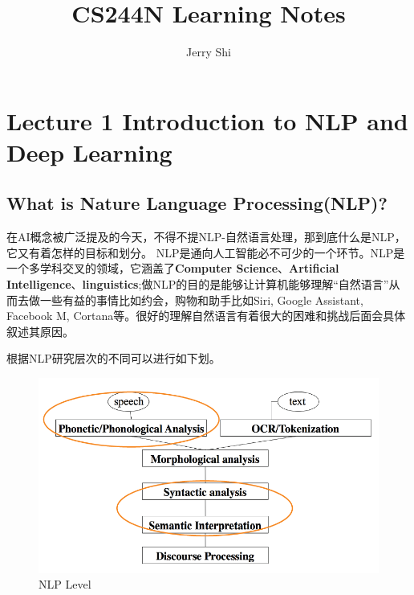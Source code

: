 \documentclass[twoside,nofonts,fancyhdr,openany,UTF8]{ctexbook}
\title{CS244N Learning Notes}	%
\author{Jerry Shi}			%
\affil{HELIX LAB}
\begin{document}
\maketitle					%

\tableofcontents 			%

\mainmatter 				%
\renewcommand\thesection{\arabic {section}}

\section{Lecture 1 Introduction to NLP and Deep Learning}			%
\subsection{What is Nature Language Processing(NLP)?}
在AI概念被广泛提及的今天，不得不提NLP-自然语言处理，那到底什么是NLP，它又有着怎样的目标和划分。
NLP是通向人工智能必不可少的一个环节。NLP是一个多学科交叉的领域，它涵盖了\textbf{Computer Science}、\textbf{Artificial Intelligence}、\textbf{linguistics};做NLP的目的是能够让计算机能够理解“自然语言”从而去做一些有益的事情比如约会，购物和助手比如Siri, Google Assistant, Facebook M, Cortana等。很好的理解自然语言有着很大的困难和挑战后面会具体叙述其原因。

根据NLP研究层次的不同可以进行如下划。

\begin{figure}[!htb]
\centering
\includegraphics[scale=0.3]{nlp_level}
\caption{NLP Level}
\end{figure}
\end{document}
